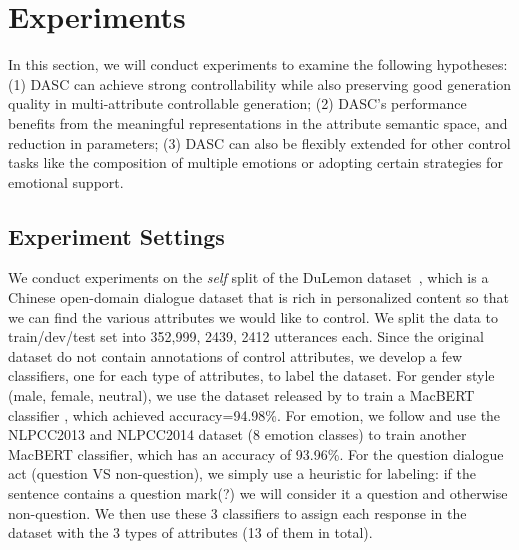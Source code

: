\section{Experiments}
\label{sec:exps}
In this section, we will conduct experiments to examine the following hypotheses: (1) DASC can achieve strong controllability while also preserving good 
generation quality in multi-attribute controllable generation; 
(2) DASC's performance benefits from the meaningful representations in the 
attribute semantic space, and reduction in parameters; 
(3) DASC can also be flexibly extended for other control tasks like the 
composition of multiple emotions or adopting certain strategies for 
emotional support. 

\subsection{Experiment Settings}
We conduct experiments on the \textit{self} split of the DuLemon 
dataset~\citep{xu2022long}, which is a Chinese open-domain dialogue dataset 
that is rich in personalized content so that we can find the various 
attributes we would like to control. We split the data to train/dev/test set 
into 352,999, 2439, 2412 utterances each. Since the original dataset do not 
contain annotations of control attributes, we develop a few classifiers, 
one for each type of attributes, to label the dataset. 
For gender style (male, female, neutral), we use 
the dataset released by \citet{su2020stylistic} to train a MacBERT classifier \citep{cui2020revisiting}, 
which achieved accuracy=94.98\%. For emotion, we 
follow \citet{zhou2018emotional} and use the NLPCC2013 and NLPCC2014 dataset 
(8 emotion classes) to train another MacBERT classifier, which has an 
accuracy of 93.96\%. For the question dialogue act (question VS non-question), 
we simply use a heuristic for labeling: if the sentence contains a question 
mark(?) we will consider it a question and otherwise non-question. 
We then use these 3 classifiers to assign each response in the dataset 
with the 3 types of attributes (13 of them in total). 

